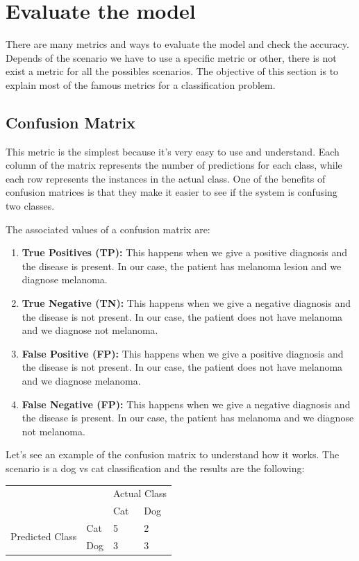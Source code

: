 \section[Evaluate the model]{Evaluate the model}
There are many metrics and ways to evaluate the model and check the accuracy. Depends of the scenario we have to use a specific metric or other, there is not exist a metric for all the possibles scenarios. 
The objective of this section is to explain most of the famous metrics for a classification problem.

\subsection[Confusion Matrix]{Confusion Matrix}
This metric is the simplest because it's very easy to use and understand. Each column of the matrix represents the number of predictions for each class, while each row represents the instances in the actual class. One of the benefits of confusion matrices is that they make it easier to see if the system is confusing two classes.

The associated values of a confusion matrix are:

\begin{enumerate}
\item \textbf{True Positives (TP):} This happens when we give a positive diagnosis and the disease is present. In our case, the patient has melanoma lesion and we diagnose melanoma.
\item \textbf{True Negative (TN):}
This happens when we give a negative diagnosis and the disease is not present. In our case, the patient does not have melanoma and we diagnose not melanoma.
\item \textbf{False Positive (FP):} 
This happens when we give a positive diagnosis and the disease is not present. In our case, the patient does not have melanoma and we diagnose melanoma.
\item \textbf{False Negative (FP):} 
This happens when we give a negative diagnosis and the disease is present. In our case, the patient has melanoma and we diagnose not melanoma.
\end{enumerate}

Let's see an example of the confusion matrix to understand how it works. 
The scenario is a dog vs cat classification and the results are the following:
\begin{table}[H]
\centering
\begin{tabular}{llll}
\multicolumn{2}{l}{}                   & \multicolumn{2}{l}{Actual Class}  \\
\multicolumn{2}{l}{}                   & Cat & Dog                         \\
\multirow{2}{*}{Predicted Class} & Cat & 5   & 2                           \\
                                 & Dog & 3   & 3                          
\end{tabular}
\end{table}

